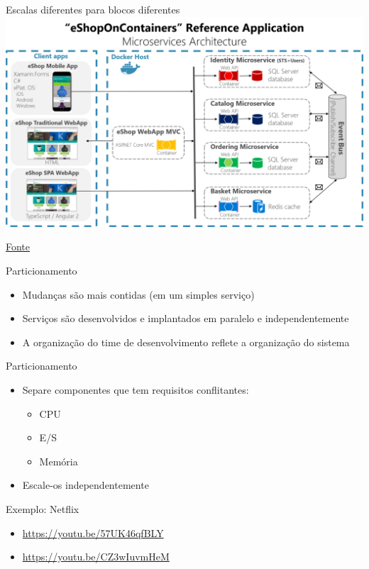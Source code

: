 \begin{frame}{Escalas diferentes para blocos diferentes}
\includegraphics[width=.7\textwidth]{images/microservice_sample}

\href{https://docs.microsoft.com/en-us/dotnet/standard/microservices-architecture/multi-container-microservice-net-applications/microservice-application-design}{Fonte}
\end{frame}

\begin{frame}{Particionamento}
\begin{itemize}
	\item Mudanças são mais contidas (em um simples serviço)
	\item Serviços são desenvolvidos e implantados em paralelo e independentemente
	\item A organização do time de desenvolvimento reflete a organização do sistema
\end{itemize}
\end{frame}

\begin{frame}{Particionamento}
\begin{itemize}
	\item Separe componentes que tem requisitos conflitantes:
	\begin{itemize}
		\item CPU
		\item E/S
		\item Memória
	\end{itemize}
	\item Escale-os independentemente
\end{itemize}
\end{frame}

\begin{frame}{Exemplo: Netflix}
\begin{itemize}
	\item \url{https://youtu.be/57UK46qfBLY}
	\item \url{https://youtu.be/CZ3wIuvmHeM}
\end{itemize}
\end{frame}

